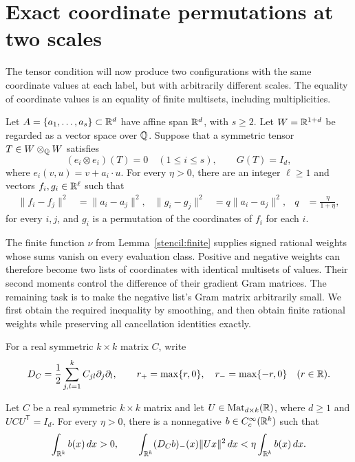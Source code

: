 \section{Exact coordinate permutations at two scales}\label{pairs:section}

The tensor condition will now produce two configurations with the same
coordinate values at each label, but with arbitrarily different scales.
The equality of coordinate values is an equality of finite multisets,
including multiplicities.

\begin{lemma}\label{pairs:two-scale}
Let $A=\{a_1,\ldots,a_s\}\subset\mathbb R^d$ have affine span $\mathbb R^d$, with
$s\geq2$. Let $W=\mathbb R^{1+d}$ be regarded as a vector space over $\mathbb Q$.
Suppose that a symmetric tensor $T\in W\otimes_{\mathbb Q}W$ satisfies
\[
 (e_i\otimes e_i)(T)=0\quad(1\leq i\leq s),
 \qquad G(T)=I_d,
\]
where $e_i(v,u)=v+a_i\cdot u$. For every $\eta>0$, there are an integer
$\ell\geq1$ and vectors $f_i,g_i\in\mathbb R^\ell$ such that
\begin{align}
 \|f_i-f_j\|^2&=\|a_i-a_j\|^2,
 &\|g_i-g_j\|^2&=q\|a_i-a_j\|^2,
 &q&=\frac{\eta}{1+\eta}, \label{pairs:distances}
\end{align}
for every $i,j$, and $g_i$ is a permutation of the coordinates of $f_i$
for each $i$.
\end{lemma}

The finite function $\nu$ from Lemma~\ref{stencil:finite} supplies signed rational
weights whose sums vanish on every evaluation class. Positive and negative
weights can therefore become two lists of coordinates with identical
multisets of values. Their second moments control the difference of their
gradient Gram matrices. The remaining task is to make the negative list's
Gram matrix arbitrarily small. We first obtain the required inequality
by smoothing, and then obtain finite rational weights while preserving
all cancellation identities exactly.

For a real symmetric $k\times k$ matrix $C$, write
\[
 D_C=\frac12\sum_{j,l=1}^k C_{jl}\partial_j\partial_l,
 \qquad r_+ = \max\{r,0\},\quad r_- = \max\{-r,0\}\quad(r\in\mathbb R).
\]

\begin{lemma}\label{pairs:bump}
Let $C$ be a real symmetric $k\times k$ matrix and let
$U\in\operatorname{Mat}_{d\times k}(\mathbb R)$, where $d\geq1$ and
$UCU^{\mathsf T}=I_d$. For every $\eta>0$, there is a nonnegative
$b\in C_c^\infty(\mathbb R^k)$ such that
\begin{equation}\label{pairs:bump-bound}
 \int_{\mathbb R^k}b(x)\,dx>0,
 \qquad
 \int_{\mathbb R^k}(D_Cb)_-(x)\|Ux\|^2\,dx
 <\eta\int_{\mathbb R^k}b(x)\,dx.
\end{equation}
\end{lemma}

